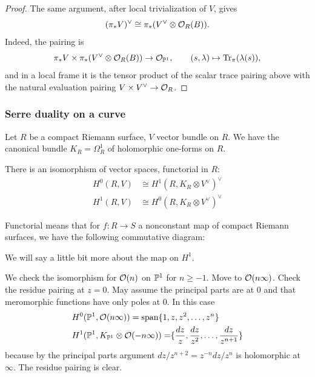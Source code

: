 \documentclass[12pt]{article}
\begin{document}
\begin{proof}
    The same argument, after local trivialization of \(V\), gives
    \[
        (\pi_*V)^\vee \cong \pi_*(V^\vee\otimes \cO_R(B)).
    \]
    Indeed, the pairing is
    \[
        \pi_*V \times \pi_*(V^\vee\otimes \cO_R(B))\to \cO_{\P^1},
        \qquad
        (s,\lambda)\mapsto \Tr_\pi(\lambda(s)),
    \]
    and in a local frame it is the tensor product of the scalar trace pairing above with the natural
    evaluation pairing \(V\times V^\vee\to \cO_R\).
\end{proof}

\subsubsection{Serre duality on a curve}
Let $R$ be a compact Riemann surface, $V$ vector bundle on $R$. We have the canonical bundle $K_R = \Omega_R^1$ of holomorphic one-forms on $R$.

\begin{theorem}
    There is an isomorphism of vector spaces, functorial in $R$:
    \begin{align*}
        H^0(R, V) & \cong H^1(R, K_R \otimes V^\vee)^\vee \\
        H^1(R, V) & \cong H^0(R, K_R \otimes V^\vee)^\vee
    \end{align*}
\end{theorem}
Functorial means that for $f: R \to S$ a nonconstant map of compact Riemann surfaces, we have the following commutative diagram:
\begin{center}
\end{center}
We will say a little bit more about the map on $H^1$.

\begin{example}
    We check the isomorphism for $\cO(n)$ on $\P^1$ for $n \geq -1$. Move to $\cO(n\infty)$. Check the residue pairing at $z=0$. May assume the principal parts are at $0$ and that meromorphic functions have only poles at $0$. In this case \begin{align*}
        H^0(\P^1, \cO(n\infty)) & = \operatorname{span}\set{1, z, z^2, \ldots, z^n} \\
        H^1(\P^1, K_{\P^1} \otimes \cO(-n\infty)) = \span\set{\frac{dz}{z},
            \frac{dz}{z^2}, \ldots, \frac{dz}{z^{n+1}}}
    \end{align*}
    because by the principal parts argument $dz/z^{n+2} = z^{-n} dz/z^n$ is holomorphic at $\infty$. The residue pairing is clear.
\end{example}
\end{document}
